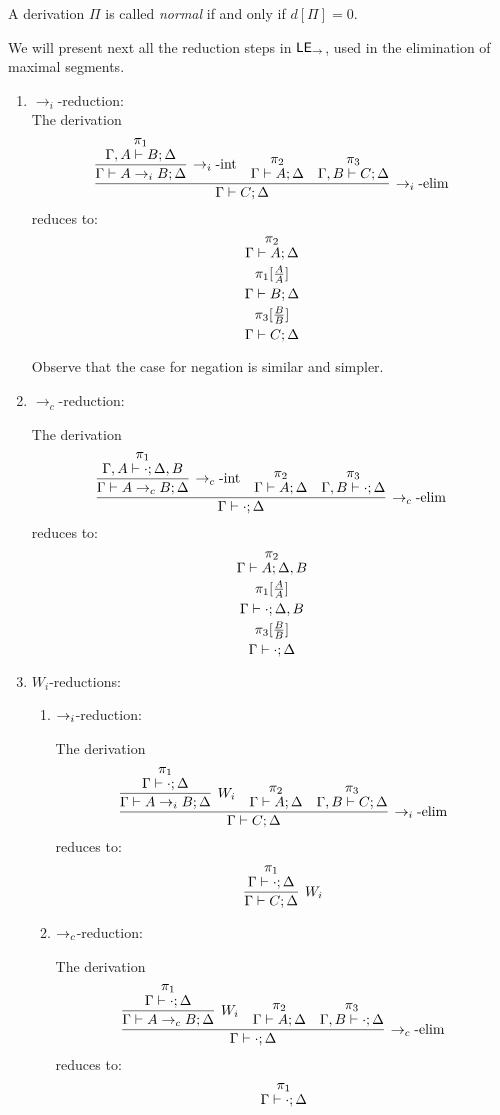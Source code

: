 \begin{definition}
A derivation $\Pi$ is called {\em normal} if and only if $d[\Pi ] = 0$.
\end{definition}
We will present next all the reduction steps in $\mathsf{LE}_{\to}$, used in the elimination of maximal segments.
\begin{enumerate}
\item $\to_{i}$-reduction:\\

The derivation
\[
\infer[\iimpe]{\stp{\Gamma}{C}{\Delta}}
{\infer[\iimpi]{\stp{\Gamma}{A\iimp B}{\Delta}}
{\deduce{\stp{\Gamma,A}{B}{\Delta}}{\pi_1}}&
\deduce{\stp{\Gamma}{A}{\Delta}}{\pi_2}&
\deduce{\stp{\Gamma,B}{C}{\Delta}}{\pi_3}}
\]
reduces to:
\[
\deduce{\stp{\Gamma}{C}{\Delta}}
{\deduce{}
{\deduce{\pi_3[\frac{B}{B}]}
{\deduce{}
{\deduce{\stp{\Gamma}{B}{\Delta}}
{\deduce{}
{\deduce{\pi_1[\frac{A}{A}]}
{\deduce{}
{\deduce{\stp{\Gamma}{A}{\Delta}}{\pi_2}}}}}}}}}
\]

Observe that the case for negation is similar and simpler.

\item $\to_{c}$-reduction:

The derivation
\[
\infer[\cimpe]{\stp{\Gamma}{\cdot}{\Delta}}
{\infer[\cimpi]{\stp{\Gamma}{A\cimp B}{\Delta}}
{\deduce{\stp{\Gamma,A}{\cdot}{\Delta,B}}{\pi_1}}&
\deduce{\stp{\Gamma}{A}{\Delta}}{\pi_2}&
\deduce{\stp{\Gamma,B}{\cdot}{\Delta}}{\pi_3}}
\]
reduces to:
\[
\deduce{\stp{\Gamma}{\cdot}{\Delta}}
{\deduce{}
{\deduce{\pi_3[\frac{B}{B}]}
{\deduce{}
{\deduce{\stp{\Gamma}{\cdot}{\Delta,B}}
{\deduce{}
{\deduce{\pi_1[\frac{A}{A}]}
{\deduce{}
{\deduce{\stp{\Gamma}{A}{\Delta,B}}{\pi_2}}}}}}}}}
\]

\item $W_i$-reductions:
  \begin{enumerate}
  \item $\rightarrow_i$-reduction:

    The derivation
    \[
      \infer[\iimpe]{\stp{\Gamma}{C}{\Delta}}
      {\infer[W_i]{\stp{\Gamma}{A\iimp B}{\Delta}}
        {\deduce{\stp{\Gamma}{\cdot}{\Delta}}{\pi_1}}&
        \deduce{\stp{\Gamma}{A}{\Delta}}{\pi_2}&
        \deduce{\stp{\Gamma, B}{C}{\Delta}}{\pi_3}}        
    \]
    reduces to:
    \[
      \infer[W_i]{\stp{\Gamma}{C}{\Delta}}
      {\deduce{\stp{\Gamma}{\cdot}{\Delta}}{\pi_1}}
    \]
    
  \item $\rightarrow_c$-reduction:

    The derivation
    \[
      \infer[\cimpe]{\stp{\Gamma}{\cdot}{\Delta}}
      {\infer[W_i]{\stp{\Gamma}{A\cimp B}{\Delta}}
        {\deduce{\stp{\Gamma}{\cdot}{\Delta}}{\pi_1}}&
        \deduce{\stp{\Gamma}{A}{\Delta}}{\pi_2}&
        \deduce{\stp{\Gamma,B}{\cdot}{\Delta}}{\pi_3}}
    \]
    reduces to:
    \[
      \deduce{\stp{\Gamma}{\cdot}{\Delta}}{\pi_1}
    \]


\end{enumerate}
\end{enumerate}
